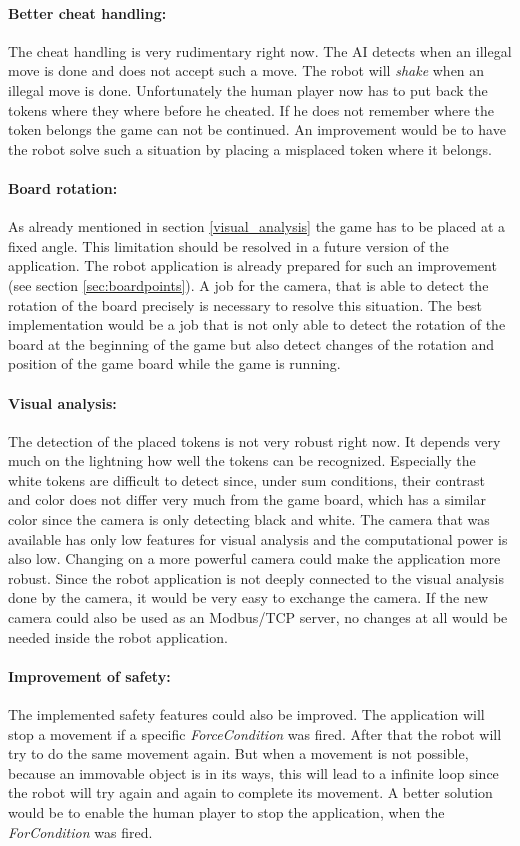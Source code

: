 \documentclass[a4paper]{spie}  %
\begin{document}
\begin{large}
\paragraph{Better cheat handling:} The cheat handling is very rudimentary right now. The AI detects when an illegal move is done and does not accept such a move. The robot will \emph{shake} when an illegal move is done. Unfortunately the human player now has to put back the tokens where they where before he cheated. If he does not remember where the token belongs the game can not be continued. An improvement would be to have the robot solve such a situation by placing a misplaced token where it belongs.
\paragraph{Board rotation:} As already mentioned in section \ref{visual_analysis} the game has to be placed at a fixed angle. This limitation should be resolved in a future version of the application. The robot application is already prepared for such an improvement (see section \ref{sec:boardpoints}). A job for the camera, that is able to detect the rotation of the board precisely is necessary to resolve this situation. The best implementation would be a job that is not only able to detect the rotation of the board at the beginning of the game but also detect changes of the rotation and position of the game board while the game is running.   
\paragraph{Visual analysis:} The detection of the placed tokens is not very robust right now. It depends very much on the lightning how well the tokens can be recognized. Especially the white tokens are difficult to detect since, under sum conditions, their contrast and color does not differ very much from the game board, which has a similar color since the camera is only detecting black and white. The camera that was available has only low features for visual analysis and the computational power is also low. Changing on a more powerful camera could make the application more robust. Since the robot application is not deeply connected to the visual analysis done by the camera, it would be very easy to exchange the camera. If the new camera could also be used as an Modbus/TCP server, no changes at all would be needed inside the robot application. 
\paragraph{Improvement of safety:} The implemented safety features could also be improved. The application will stop a movement if a specific \emph{ForceCondition} was fired. After that the robot will try to do the same movement again. But when a movement is not possible, because an immovable object is in its ways, this will lead to a infinite loop since the robot will try again and again to complete its movement. A better solution would be to enable the human player to stop the application, when the \emph{ForCondition} was fired.

\end{large}
\end{document}
